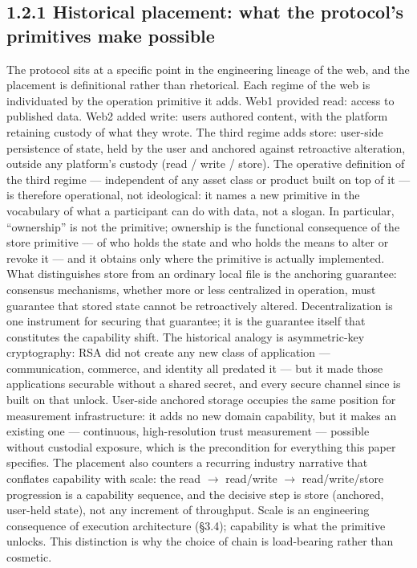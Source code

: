 \documentclass[11pt,twocolumn]{article}
\begin{document}
\subsection*{1.2.1 Historical placement: what the protocol's primitives
make
possible}

The protocol sits at a specific point in the engineering lineage of the
web, and the placement is definitional rather than rhetorical. Each
regime of the web is individuated by the operation primitive it adds.
Web1 provided read: access to published data. Web2 added write: users
authored content, with the platform retaining custody of what they
wrote. The third regime adds store: user-side persistence of state,
held by the user and anchored against retroactive alteration, outside
any platform's custody (read / write / store). The operative definition
of the third regime --- independent of any asset class or product built
on top of it --- is therefore operational, not ideological: it names a
new primitive in the vocabulary of what a participant can do with data,
not a slogan. In particular, ``ownership'' is not the primitive;
ownership is the functional consequence of the store primitive --- of
who holds the state and who holds the means to alter or revoke it ---
and it obtains only where the primitive is actually implemented. What
distinguishes store from an ordinary local file is the anchoring
guarantee: consensus mechanisms, whether more or less centralized in
operation, must guarantee that stored state cannot be retroactively
altered. Decentralization is one instrument for securing that guarantee;
it is the guarantee itself that constitutes the capability shift. The
historical analogy is asymmetric-key cryptography: RSA did not create
any new class of application --- communication, commerce, and identity
all predated it --- but it made those applications securable without a
shared secret, and every secure channel since is built on that unlock.
User-side anchored storage occupies the same position for measurement
infrastructure: it adds no new domain capability, but it makes an
existing one --- continuous, high-resolution trust measurement ---
possible without custodial exposure, which is the precondition for
everything this paper specifies. The placement also counters a recurring
industry narrative that conflates capability with scale: the read
\(\to\) read/write \(\to\) read/write/store progression is a capability
sequence, and the decisive step is store (anchored, user-held state),
not any increment of throughput. Scale is an engineering consequence of
execution architecture (§3.4); capability is what the primitive unlocks.
This distinction is why the choice of chain is load-bearing rather than
cosmetic.
\end{document}
